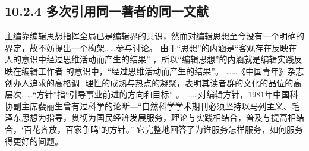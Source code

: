 \documentclass{article}
\begin{document}
\subsection*{10.2.4 多次引用同一著者的同一文献}
\begin{refsection}
主编靠编辑思想指挥全局已是编辑界的共识\cite{张忠智1997-33-34}，然而对编辑思想至今没有一个明确的界定，故不妨提出一个构架……参与讨论。
由于“思想”的内涵是“客观存在反映在人的意识中经过思维活动而产生的结果”
，所以“编辑思想”的内涵就是编辑实践反映在编辑工作者
的意识中，“经过思维活动而产生的结果”。
……《中国青年》杂志创办人追求的高格调-
理性的成熟与热点的凝聚\cite{刘彻东1998-38-39}，表明其读者群的文化的品位的高层次……“方针”指“引导事业前进的方向和目标”
。
……对编辑方针，1981年中国科协副主席裴丽生曾有过科学的论断—“自然科学学术期刊必须坚持以马列主义、毛泽东思想为指导，贯彻为国民经济发展服务，理论与实践相结合，普及与提高相结合，‘百花齐放，百家争鸣’的方针。” \cite{裴丽生1981-2-10}它完整地回答了为谁服务怎样服务，如何服务得更好的间题。

\printbibliography[heading=subbibliography]
\end{refsection}
\end{document}
